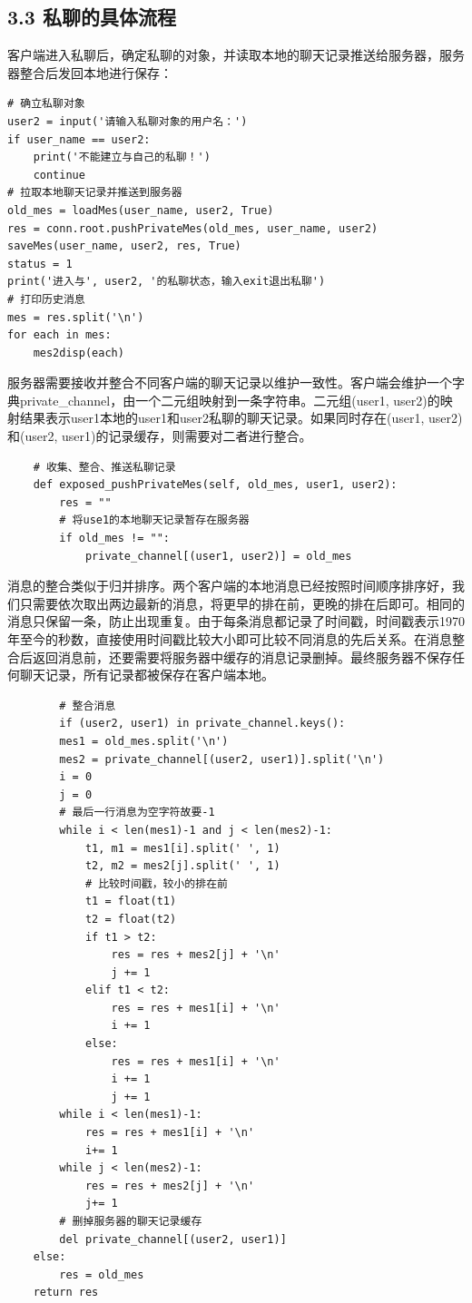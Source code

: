 \documentclass{report}
\begin{document}
\subsection*{3.3 私聊的具体流程}
客户端进入私聊后，确定私聊的对象，并读取本地的聊天记录推送给服务器，服务器整合后发回本地进行保存：
\begin{lstlisting}
# 确立私聊对象
user2 = input('请输入私聊对象的用户名：')
if user_name == user2:
    print('不能建立与自己的私聊！')
    continue
# 拉取本地聊天记录并推送到服务器
old_mes = loadMes(user_name, user2, True)
res = conn.root.pushPrivateMes(old_mes, user_name, user2)
saveMes(user_name, user2, res, True)
status = 1
print('进入与', user2, '的私聊状态，输入exit退出私聊')
# 打印历史消息
mes = res.split('\n')
for each in mes:
    mes2disp(each)
\end{lstlisting}
服务器需要接收并整合不同客户端的聊天记录以维护一致性。客户端会维护一个字典private\_channel，由一个二元组映射到一条字符串。二元组(user1, user2)的映射结果表示user1本地的user1和user2私聊的聊天记录。如果同时存在(user1, user2)和(user2, user1)的记录缓存，则需要对二者进行整合。
\begin{lstlisting}
    # 收集、整合、推送私聊记录
    def exposed_pushPrivateMes(self, old_mes, user1, user2):
        res = ""
        # 将use1的本地聊天记录暂存在服务器
        if old_mes != "":
            private_channel[(user1, user2)] = old_mes
\end{lstlisting}
消息的整合类似于归并排序。两个客户端的本地消息已经按照时间顺序排序好，我们只需要依次取出两边最新的消息，将更早的排在前，更晚的排在后即可。相同的消息只保留一条，防止出现重复。由于每条消息都记录了时间戳，时间戳表示1970年至今的秒数，直接使用时间戳比较大小即可比较不同消息的先后关系。在消息整合后返回消息前，还要需要将服务器中缓存的消息记录删掉。最终服务器不保存任何聊天记录，所有记录都被保存在客户端本地。
\begin{lstlisting}
        # 整合消息
        if (user2, user1) in private_channel.keys():
        mes1 = old_mes.split('\n')
        mes2 = private_channel[(user2, user1)].split('\n')
        i = 0
        j = 0
        # 最后一行消息为空字符故要-1
        while i < len(mes1)-1 and j < len(mes2)-1:
            t1, m1 = mes1[i].split(' ', 1)
            t2, m2 = mes2[j].split(' ', 1)
            # 比较时间戳，较小的排在前
            t1 = float(t1)
            t2 = float(t2)
            if t1 > t2:
                res = res + mes2[j] + '\n'
                j += 1
            elif t1 < t2:
                res = res + mes1[i] + '\n'
                i += 1
            else:
                res = res + mes1[i] + '\n'
                i += 1
                j += 1
        while i < len(mes1)-1:
            res = res + mes1[i] + '\n'
            i+= 1
        while j < len(mes2)-1:
            res = res + mes2[j] + '\n'
            j+= 1
        # 删掉服务器的聊天记录缓存
        del private_channel[(user2, user1)]
    else:
        res = old_mes
    return res
\end{lstlisting}
\end{document}
